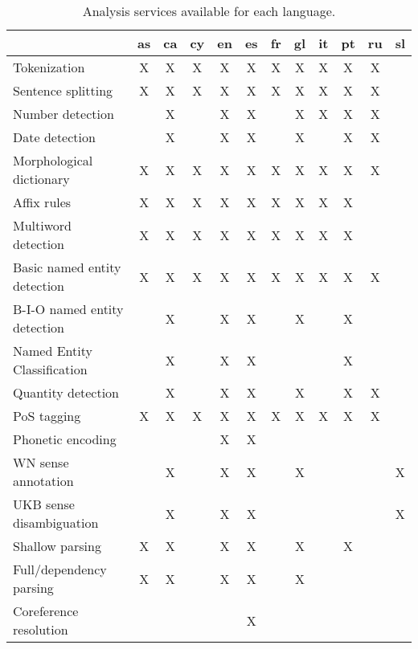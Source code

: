 \documentclass[a4paper]{book}
\begin{document}
\begin{table}[htb] \center
\begin{tabular}{l|ccccccccccc|}
                            & as & ca & cy & en & es & fr & gl & it & pt & ru & sl \\ \hline
Tokenization                & X  & X  & X  & X  & X  & X  & X  & X  & X  & X  &    \\
Sentence splitting          & X  & X  & X  & X  & X  & X  & X  & X  & X  & X  &    \\
Number detection            &    & X  &    & X  & X  &    & X  & X  & X  & X  &    \\
Date detection              &    & X  &    & X  & X  &    & X  &    & X  & X  &    \\
Morphological dictionary    & X  & X  & X  & X  & X  & X  & X  & X  & X  & X  &    \\
Affix rules                 & X  & X  & X  & X  & X  & X  & X  & X  & X  &    &    \\
Multiword detection         & X  & X  & X  & X  & X  & X  & X  & X  & X  &    &    \\
Basic named entity detection& X  & X  & X  & X  & X  & X  & X  & X  & X  & X  &    \\
B-I-O named entity detection&    & X  &    & X  & X  &    & X  &    & X  &    &    \\
Named Entity Classification &    & X  &    & X  & X  &    &    &    & X  &    &    \\ 
Quantity detection          &    & X  &    & X  & X  &    & X  &    & X  & X  &    \\ 
PoS tagging                 & X  & X  & X  & X  & X  & X  & X  & X  & X  & X  &    \\ 
Phonetic encoding           &    &    &    & X  & X  &    &    &    &    &    &    \\ 
WN sense annotation         &    & X  &    & X  & X  &    & X  &    &    &    & X  \\
UKB sense disambiguation    &    & X  &    & X  & X  &    &    &    &    &    & X  \\
Shallow parsing             & X  & X  &    & X  & X  &    & X  &    & X  &    &    \\ 
Full/dependency parsing     & X  & X  &    & X  & X  &    & X  &    &    &    &    \\
Coreference resolution      &    &    &    &    & X  &    &    &    &    &    &    \\ \hline
\end{tabular}
\label{t-langs}
\caption{Analysis services available for each language.}
\end{table}
\end{document}
